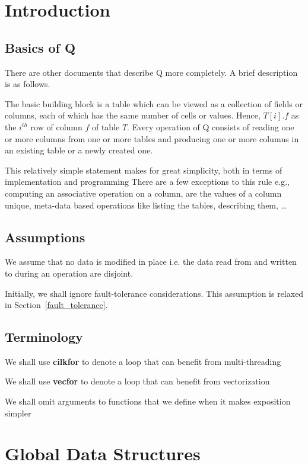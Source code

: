 
\section{Introduction}
\subsection{Basics of Q}
There are other documents that describe Q more completely. A brief
description is as follows.

The basic building block is a table which can be viewed as a collection
of fields or columns, each of which has the same number of cells or
values. Hence, \(T[i].f\) as the \(i^{th}\) row of column \(f\) of table
\(T\).  Every operation of Q consists of reading one or more columns
from one or more tables and producing one or more columns in an existing
table or a newly created one.

This relatively simple statement makes for great simplicity, both in
terms of implementation and programming There are a few exceptions to
this rule e.g., computing an associative operation on a column, are
the values of a column unique, meta-data based operations like listing
the tables, describing them, \ldots

\subsection{Assumptions}
\be
\item 
We assume that no data is modified in place i.e. the data read from and
written to during an operation are disjoint.
\item 
Initially, we shall ignore fault-tolerance considerations. This
assumption is relaxed in Section~\ref{fault_tolerance}.
\ee

\subsection{Terminology}
\be
\item We shall use {\bf cilkfor} to denote a loop that can benefit from
multi-threading
\item We shall use {\bf vecfor} to denote a loop that can benefit from
vectorization
\item We shall omit arguments to functions that we define when it makes
exposition simpler
\ee

\section{Global Data Structures}

